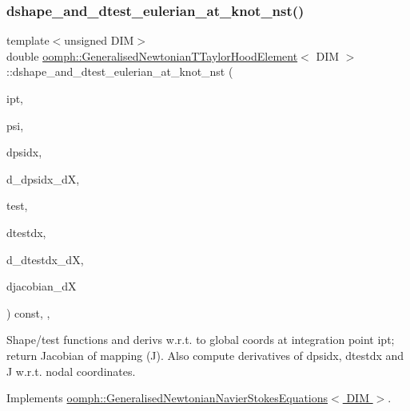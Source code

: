 \subsubsection{\texorpdfstring{dshape\+\_\+and\+\_\+dtest\+\_\+eulerian\+\_\+at\+\_\+knot\+\_\+nst()}{dshape\_and\_dtest\_eulerian\_at\_knot\_nst()}\hspace{0.1cm}{\footnotesize\ttfamily [2/4]}}
{\footnotesize\ttfamily template$<$unsigned D\+IM$>$ \\
double \hyperlink{classoomph_1_1GeneralisedNewtonianTTaylorHoodElement}{oomph\+::\+Generalised\+Newtonian\+T\+Taylor\+Hood\+Element}$<$ D\+IM $>$\+::dshape\+\_\+and\+\_\+dtest\+\_\+eulerian\+\_\+at\+\_\+knot\+\_\+nst (\begin{DoxyParamCaption}\item[{const unsigned \&}]{ipt,  }\item[{\hyperlink{classoomph_1_1Shape}{Shape} \&}]{psi,  }\item[{\hyperlink{classoomph_1_1DShape}{D\+Shape} \&}]{dpsidx,  }\item[{\hyperlink{classoomph_1_1RankFourTensor}{Rank\+Four\+Tensor}$<$ double $>$ \&}]{d\+\_\+dpsidx\+\_\+dX,  }\item[{\hyperlink{classoomph_1_1Shape}{Shape} \&}]{test,  }\item[{\hyperlink{classoomph_1_1DShape}{D\+Shape} \&}]{dtestdx,  }\item[{\hyperlink{classoomph_1_1RankFourTensor}{Rank\+Four\+Tensor}$<$ double $>$ \&}]{d\+\_\+dtestdx\+\_\+dX,  }\item[{\hyperlink{classoomph_1_1DenseMatrix}{Dense\+Matrix}$<$ double $>$ \&}]{djacobian\+\_\+dX }\end{DoxyParamCaption}) const\hspace{0.3cm}{\ttfamily [inline]}, {\ttfamily [protected]}, {\ttfamily [virtual]}}



Shape/test functions and derivs w.\+r.\+t. to global coords at integration point ipt; return Jacobian of mapping (J). Also compute derivatives of dpsidx, dtestdx and J w.\+r.\+t. nodal coordinates. 



Implements \hyperlink{classoomph_1_1GeneralisedNewtonianNavierStokesEquations_a24a93b73dba66e04eabb9b37a9360daa}{oomph\+::\+Generalised\+Newtonian\+Navier\+Stokes\+Equations$<$ D\+I\+M $>$}.

\mbox{\label{classoomph_1_1GeneralisedNewtonianTTaylorHoodElement_afddd17add4a6c36248ed8fd68779a495}} 
